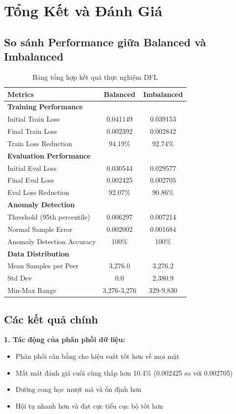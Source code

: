 \section{Tổng Kết và Đánh Giá}

\subsection{So sánh Performance giữa Balanced và Imbalanced}

\begin{table}[H]
\centering
\caption{Bảng tổng hợp kết quả thực nghiệm DFL}
\begin{tabular}{lcc}
\toprule
\textbf{Metrics} & \textbf{Balanced} & \textbf{Imbalanced} \\
\midrule
\textbf{Training Performance} & & \\
Initial Train Loss & 0.041149 & 0.039153 \\
Final Train Loss & 0.002392 & 0.002842 \\
Train Loss Reduction & 94.19\% & 92.74\% \\
\midrule
\textbf{Evaluation Performance} & & \\
Initial Eval Loss & 0.030544 & 0.029577 \\
Final Eval Loss & 0.002425 & 0.002705 \\
Eval Loss Reduction & 92.07\% & 90.86\% \\
\midrule
\textbf{Anomaly Detection} & & \\
Threshold (95th percentile) & 0.006297 & 0.007214 \\
Normal Sample Error & 0.002002 & 0.001684 \\
Anomaly Detection Accuracy & 100\% & 100\% \\
\midrule
\textbf{Data Distribution} & & \\
Mean Samples per Peer & 3,276.0 & 3,276.2 \\
Std Dev & 0.0 & 2,380.9 \\
Min-Max Range & 3,276-3,276 & 329-9,830 \\
\bottomrule
\end{tabular}
\end{table}

\subsection{Các kết quả chính}

\textbf{1. Tác động của phân phối dữ liệu:}
\begin{itemize}
    \item Phân phối cân bằng cho hiệu suất tốt hơn về mọi mặt
    \item Mất mát đánh giá cuối cùng thấp hơn 10.4\% (0.002425 so với 0.002705)
    \item Đường cong học mượt mà và ổn định hơn
    \item Hội tụ nhanh hơn và đạt cực tiểu cục bộ tốt hơn
\end{itemize}

